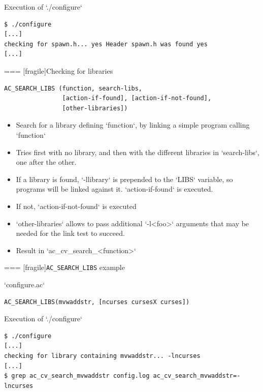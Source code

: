 \begin{block}{Execution of `./configure`}
\begin{verbatim}
$ ./configure
[...]
checking for spawn.h... yes Header spawn.h was found yes
[...]
\end{verbatim}
\end{block}



=== [fragile]{Checking for libraries}
  \begin{block}{}
\begin{verbatim}
AC_SEARCH_LIBS (function, search-libs,
                [action-if-found], [action-if-not-found],
                [other-libraries])
\end{verbatim}
  \end{block}

  \begin{itemize}
  \item Search for a library defining `function`, by linking a
    simple program calling `function`
  \item Tries first with no library, and then with the different
    libraries in `search-libs`, one after the other.
  \item If a library is found, `-llibrary` is prepended to the
    `LIBS` variable, so programs will be linked against
    it. `action-if-found` is executed.
  \item If not, `action-if-not-found` is executed
  \item `other-libraries` allows to pass additional
    `-l<foo>` arguments that may be needed for the link test to
    succeed.
  \item Result in `ac_cv_search_<function>`
  \end{itemize}


=== [fragile]{{\tt AC\_SEARCH\_LIBS} example}

\begin{block}{`configure.ac`}
\begin{verbatim}
AC_SEARCH_LIBS(mvwaddstr, [ncurses cursesX curses])
\end{verbatim}
\end{block}

\begin{block}{Execution of `./configure`}
\begin{verbatim}
$ ./configure
[...]
checking for library containing mvwaddstr... -lncurses
[...]
$ grep ac_cv_search_mvwaddstr config.log ac_cv_search_mvwaddstr=-lncurses
\end{verbatim}
\end{block}

